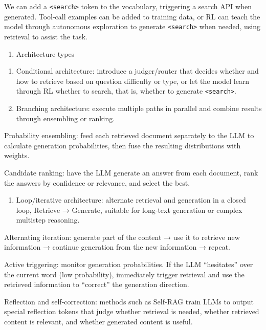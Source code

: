 We can add a \texttt{\textless{}search\textgreater{}} token to the vocabulary, triggering a search API when generated. Tool-call examples can be added to training data, or RL can teach the model through autonomous exploration to generate \texttt{\textless{}search\textgreater{}} when needed, using retrieval to assist the task.

\begin{enumerate}
\def\labelenumi{\arabic{enumi}.}
\tightlist
\item
  Architecture types
\end{enumerate}

\begin{enumerate}
\def\labelenumi{(\arabic{enumi})}
\item
  Conditional architecture: introduce a judger/router that decides whether and how to retrieve based on question difficulty or type, or let the model learn through RL whether to search, that is, whether to generate \texttt{\textless{}search\textgreater{}}.
\item
  Branching architecture: execute multiple paths in parallel and combine results through ensembling or ranking.
\end{enumerate}

Probability ensembling: feed each retrieved document separately to the LLM to calculate generation probabilities, then fuse the resulting distributions with weights.

Candidate ranking: have the LLM generate an answer from each document, rank the answers by confidence or relevance, and select the best.

\begin{enumerate}
\def\labelenumi{(\arabic{enumi})}
\setcounter{enumi}{2}
\tightlist
\item
  Loop/iterative architecture: alternate retrieval and generation in a closed loop, Retrieve → Generate, suitable for long-text generation or complex multistep reasoning.
\end{enumerate}

Alternating iteration: generate part of the content → use it to retrieve new information → continue generation from the new information → repeat.

Active triggering: monitor generation probabilities. If the LLM ``hesitates'' over the current word (low probability), immediately trigger retrieval and use the retrieved information to ``correct'' the generation direction.

Reflection and self-correction: methods such as Self-RAG train LLMs to output special reflection tokens that judge whether retrieval is needed, whether retrieved content is relevant, and whether generated content is useful.

